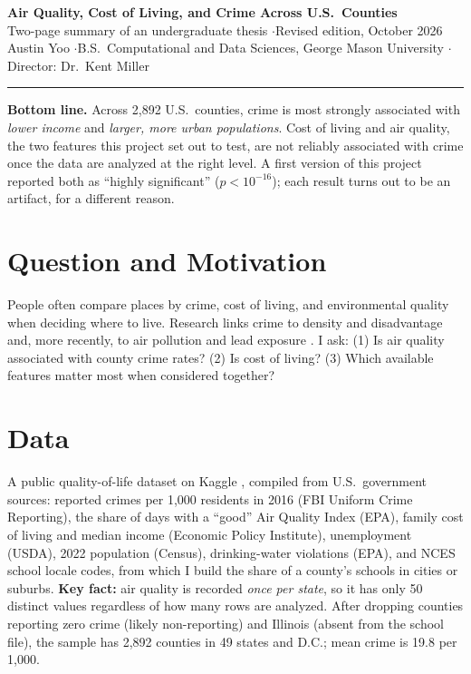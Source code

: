 \documentclass[10pt,letterpaper]{article}
\begin{document}
\begin{center}
{\Large\bfseries Air Quality, Cost of Living, and Crime Across U.S.\ Counties}\\[3pt]
{\normalsize Two-page summary of an undergraduate thesis \quad$\cdot$\quad Revised edition, October 2026}\\[2pt]
{\small Austin Yoo \quad$\cdot$\quad B.S.\ Computational and Data Sciences, George Mason
University \quad$\cdot$\quad Director: Dr.\ Kent Miller}
\end{center}

\vspace{-4pt}
\noindent\rule{\textwidth}{0.4pt}

\textbf{Bottom line.} Across 2,892 U.S.\ counties, crime is most strongly associated with
\emph{lower income} and \emph{larger, more urban populations}. Cost of living and air quality,
the two features this project set out to test, are not reliably associated with crime once
the data are analyzed at the right level. A first version of this project reported both as
``highly significant'' ($p<10^{-16}$); each result turns out to be an artifact, for a
different reason.

\section{Question and Motivation}
People often compare places by crime, cost of living, and environmental quality when deciding
where to live. Research links crime to density and disadvantage
\cite{glaeser1999,sampson1997} and, more recently, to air pollution and lead exposure
\cite{bondy2020,reyes2007}. I ask: (1) Is air quality associated with county crime rates?
(2) Is cost of living? (3) Which available features matter most when considered together?

\section{Data}
A public quality-of-life dataset on Kaggle \cite{vaughan}, compiled from U.S.\ government
sources: reported crimes per
1,000 residents in 2016 (FBI Uniform Crime Reporting), the share of days with a ``good'' Air
Quality Index (EPA), family cost of living and median income (Economic Policy Institute),
unemployment (USDA), 2022 population (Census), drinking-water violations (EPA), and NCES
school locale codes, from which I build the share of a county's schools in cities or suburbs.
\textbf{Key fact:} air quality is recorded \emph{once per state}, so it has only 50 distinct
values regardless of how many rows are analyzed. After dropping counties reporting zero crime
(likely non-reporting) and Illinois (absent from the school file), the sample has 2,892
counties in 49 states and D.C.; mean crime is 19.8 per 1,000.
\end{document}
